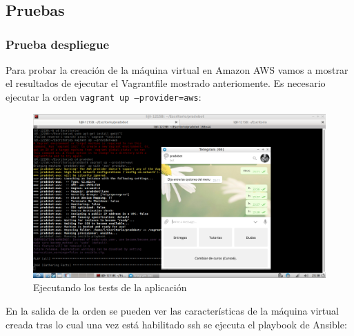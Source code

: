 \chapter{}

\section{Pruebas}

\subsection{Prueba despliegue}

Para probar la creación de la máquina virtual en Amazon AWS vamos a mostrar el resultados de ejecutar el Vagrantfile mostrado anteriomente. Es necesario ejecutar la orden \texttt{vagrant up --provider=aws}:
\begin{figure}[H] %
\centering
\includegraphics[scale=0.3]{imagenes/random/123bot.png}  %

\caption{Ejecutando los tests de la aplicación}\label{figura92}

\end{figure}

En la salida de la orden se pueden ver las características de la máquina virtual creada tras lo cual una vez está habilitado ssh se ejecuta el playbook de Ansible:

